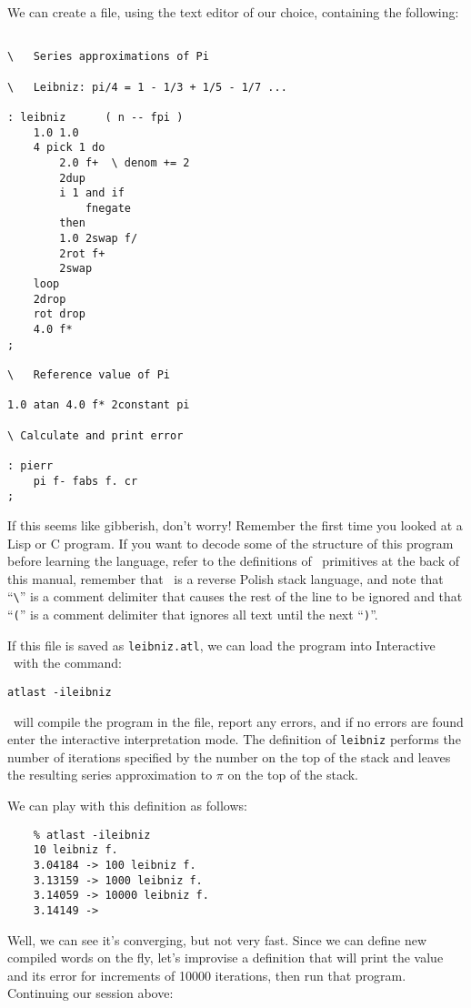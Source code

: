 \documentclass[twocolumn]{article}
\begin{document}
We can create a file, using the text editor of our choice, containing
the following:

\begin{verbatim}

\   Series approximations of Pi

\   Leibniz: pi/4 = 1 - 1/3 + 1/5 - 1/7 ...

: leibniz      ( n -- fpi )
    1.0 1.0
    4 pick 1 do
        2.0 f+  \ denom += 2
        2dup
        i 1 and if
            fnegate
        then
        1.0 2swap f/
        2rot f+
        2swap
    loop
    2drop
    rot drop
    4.0 f*
;

\   Reference value of Pi

1.0 atan 4.0 f* 2constant pi

\ Calculate and print error

: pierr
    pi f- fabs f. cr
;
\end{verbatim}

If this seems like gibberish, don't worry!  Remember the first time
you looked at a Lisp or C program.  If you want to decode some of the
structure of this program before learning the language, refer to the
definitions of \atlast\ primitives at the back of this manual, remember
that \atlast\ is a reverse Polish stack language, and note that
``\verb+\+'' is a comment delimiter that causes the rest of the line
to be ignored and that ``{\tt (}'' is a comment delimiter that ignores
all text until the next ``{\tt )}''.

If this file is saved as {\tt leibniz.atl},
we can load the program into Interactive \atlast\ with the command:

{\tt atlast -ileibniz}

\atlast\ will compile the program in the file, report any errors, and
if no errors are found enter the interactive interpretation mode.
The definition of {\tt leibniz} performs the number of iterations
specified by the number on the top of the stack and leaves the
resulting series approximation to $\pi$ on the top of the stack.

We can play with this definition as follows:

\begin{verbatim}
    % atlast -ileibniz
    10 leibniz f.
    3.04184 -> 100 leibniz f.
    3.13159 -> 1000 leibniz f.
    3.14059 -> 10000 leibniz f.
    3.14149 ->   
\end{verbatim}

Well, we can see it's converging, but not very fast.  Since we can
define new compiled words on the fly, let's improvise a definition
that will print the value and its error for increments of 10000
iterations, then run that program.  Continuing our session above:
\end{document}
